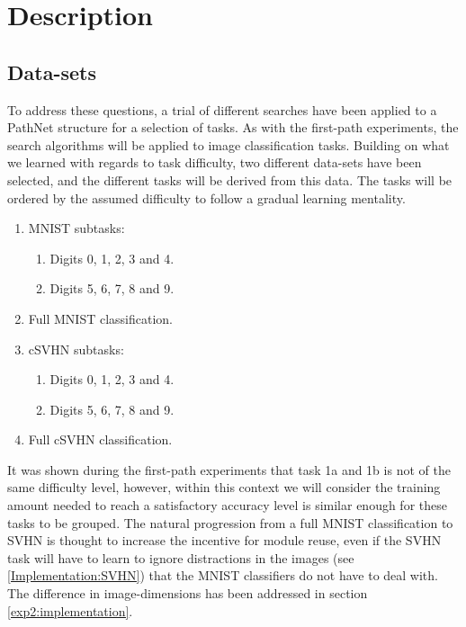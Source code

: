 \section{Description}
\label{exp2:description}
\subsection{Data-sets} 
\label{exp2:datasets}
To address these questions, a trial of different searches have been applied to a PathNet structure for a selection of tasks. As with the first-path experiments, the search algorithms will be applied to image classification tasks. Building on what we learned with regards to task difficulty, two different data-sets have been selected, and the different tasks will be derived from this data. The tasks will be ordered by the assumed difficulty to follow a gradual learning mentality. 

\begin{enumerate}
    \item MNIST subtasks:
    \begin{enumerate}
        \item Digits 0, 1, 2, 3 and 4.
        \item Digits 5, 6, 7, 8 and 9. 
    \end{enumerate}
    \item Full MNIST classification.
    \item cSVHN subtasks:
    \begin{enumerate}
        \item Digits 0, 1, 2, 3 and 4.
        \item Digits 5, 6, 7, 8 and 9. 
    \end{enumerate}
    \item Full cSVHN classification.
\end{enumerate}

It was shown during the first-path experiments that task 1a and 1b is not of the same difficulty level, however, within this context we will consider the training amount needed to reach a satisfactory accuracy level is similar enough for these tasks to be grouped. The natural progression from a full MNIST classification to  SVHN is thought to increase the incentive for module reuse, even if the SVHN task will have to learn to ignore distractions in the images (see \ref{Implementation:SVHN}) that the MNIST classifiers do not have to deal with. The difference in image-dimensions has been addressed in section \ref{exp2:implementation}.

